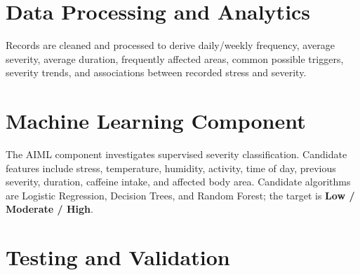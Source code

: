 \documentclass[11pt,a4paper]{article}
\begin{document}
\section{Data Processing and Analytics}

Records are cleaned and processed to derive daily/weekly frequency, average severity, average duration, frequently affected areas, common possible triggers, severity trends, and associations between recorded stress and severity.

\begin{center}
\end{center}

\section{Machine Learning Component}

The AIML component investigates supervised severity classification. Candidate features include stress, temperature, humidity, activity, time of day, previous severity, duration, caffeine intake, and affected body area. Candidate algorithms are Logistic Regression, Decision Trees, and Random Forest; the target is \textbf{Low / Moderate / High}.

\begin{center}
\end{center}


\section{Testing and Validation}
\end{document}
